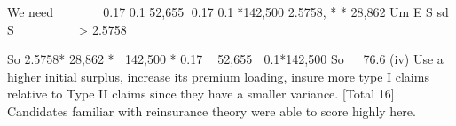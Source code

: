 \documentclass[a4paper,12pt]{article}
\begin{document}
We need
   
 
0.17 0.1 52,655 0.17 0.1*142,500
2.5758,
* * 28,862
Um E S
sd S
   

 
> 2.5758

So
2.5758* 28,862 * 142,500 * 0.17  52,655  0.1*142,500
So
  76.6%
(iv) Use a higher initial surplus, 
increase its premium loading, 
insure more type I claims relative to Type II claims since they have a smaller
variance. 
[Total 16]
Candidates familiar with reinsurance theory were able to score highly here.
\end{document}
